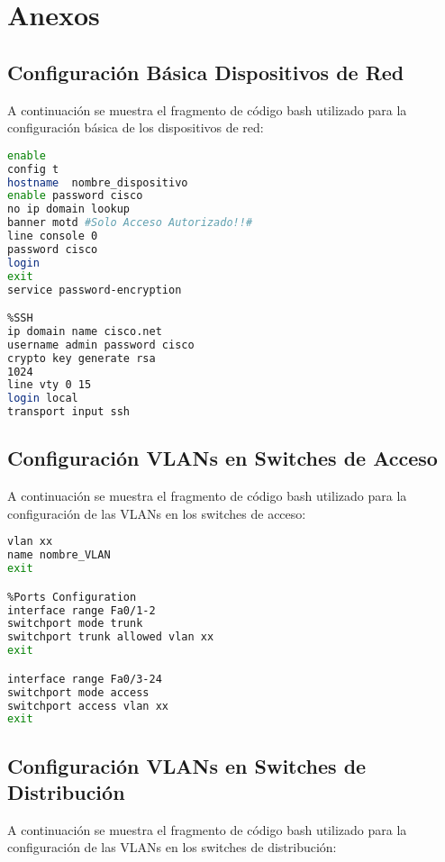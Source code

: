 \chapter{Anexos}\label{Anexo}

\section{Configuración Básica Dispositivos de Red}\label{anexo:confBas}
A continuación se muestra el fragmento de código bash utilizado para la configuración básica de los dispositivos de red:

\begin{lstlisting}[language=Bash, caption={Configuración Básica de los Dispositivos de Red}]
%Passwords
enable  
config t  
hostname  nombre_dispositivo 
enable password cisco  
no ip domain lookup  
banner motd #Solo Acceso Autorizado!!#  
line console 0  
password cisco  
login  
exit  
service password-encryption 

%SSH 
ip domain name cisco.net  
username admin password cisco  
crypto key generate rsa  
1024 
line vty 0 15  
login local  
transport input ssh
\end{lstlisting}

\section{Configuración VLANs en Switches de Acceso}\label{anexo:VLANSwAcc}
A continuación se muestra el fragmento de código bash utilizado para la configuración de las VLANs en los switches de acceso:

\begin{lstlisting}[language=Bash, caption={Configuración VLANs en Switches de Acceso}]
%Create VLAN
vlan xx 
name nombre_VLAN 
exit 

%Ports Configuration
interface range Fa0/1-2 
switchport mode trunk 
switchport trunk allowed vlan xx
exit 

interface range Fa0/3-24 
switchport mode access 
switchport access vlan xx
exit 
\end{lstlisting}

\section{Configuración VLANs en Switches de Distribución}\label{anexo:VLANSwDis}
A continuación se muestra el fragmento de código bash utilizado para la configuración de las VLANs en los switches de distribución:

